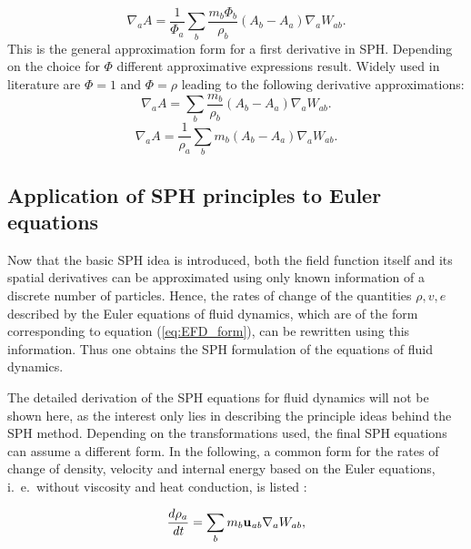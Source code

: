 \documentclass[11pt,a4paper,twoside]{report}
\begin{document}
\begin{equation}
\label{eq:genFirstDerivativeSPH_Approximation}
\nabla_a A = \frac{1}{\Phi_a}\sum_b \frac{m_b \Phi_b}{\rho_b}(A_b-A_a)\nabla_a W_{ab}.
\end{equation}
This is the general approximation form for a first derivative in SPH. Depending on the choice for $\Phi$ different approximative expressions result. Widely used in literature are $\Phi=1$ and $\Phi=\rho$ leading to the following derivative approximations:
\begin{equation}
\label{eq:genFirstDerivativeSPH_Approximation_Phi_1}
\nabla_a A = \sum_b \frac{m_b}{\rho_b}(A_b-A_a)\nabla_a W_{ab}.
\end{equation}
\begin{equation}
\label{eq:genFirstDerivativeSPH_Approximation_Phi_rho}
\nabla_a A = \frac{1}{\rho_a}\sum_b m_b (A_b-A_a)\nabla_a W_{ab}.
\end{equation}

\subsection{Application of SPH principles to Euler equations}

Now that the basic SPH idea is introduced, both the field function
itself and its spatial derivatives can be approximated using only known information of a discrete number of particles. Hence, the rates of change of
the quantities $\rho,v, e$ described by the Euler equations of fluid dynamics, which are of the form
corresponding to equation (\ref{eq:EFD_form}), can be rewritten using this information. Thus 
one obtains the SPH formulation of the equations of fluid dynamics.

The detailed derivation of the SPH equations for fluid dynamics will not be shown here, as the interest  only lies in describing the principle ideas behind the SPH
method. Depending on the transformations used, the final SPH equations can assume a different form. In the following, a common form for the rates of change of density, velocity and
internal energy based on the Euler equations, i.\ e.\ without viscosity and heat conduction, is listed \cite{Monaghan2005,Liu2003}: 

\begin{equation}
\label{eq:DCR_Euler}
\frac{d\rho _a}{\mathit{dt}}=\sum_b{m_{b}{\bf u_{\mathit{ab}}}\nabla _{a}W_{\mathit{ab}}},
\end{equation}
\end{document}
